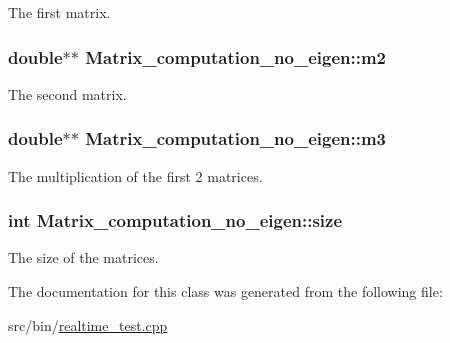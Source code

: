 The first matrix. 

\subsubsection[{\texorpdfstring{m2}{m2}}]{\setlength{\rightskip}{0pt plus 5cm}double$\ast$$\ast$ Matrix\+\_\+computation\+\_\+no\+\_\+eigen\+::m2\hspace{0.3cm}{\ttfamily [private]}}\hypertarget{classMatrix__computation__no__eigen_a4cda5f8f06be2a85621b1ce1eca7cded}{}\label{classMatrix__computation__no__eigen_a4cda5f8f06be2a85621b1ce1eca7cded}


The second matrix. 

\subsubsection[{\texorpdfstring{m3}{m3}}]{\setlength{\rightskip}{0pt plus 5cm}double$\ast$$\ast$ Matrix\+\_\+computation\+\_\+no\+\_\+eigen\+::m3\hspace{0.3cm}{\ttfamily [private]}}\hypertarget{classMatrix__computation__no__eigen_a54b2738e77b3282368ac2c7fd184d2a3}{}\label{classMatrix__computation__no__eigen_a54b2738e77b3282368ac2c7fd184d2a3}


The multiplication of the first 2 matrices. 

\subsubsection[{\texorpdfstring{size}{size}}]{\setlength{\rightskip}{0pt plus 5cm}int Matrix\+\_\+computation\+\_\+no\+\_\+eigen\+::size\hspace{0.3cm}{\ttfamily [private]}}\hypertarget{classMatrix__computation__no__eigen_a1f73cf9e7670c6a78a64cb8977f2dcc6}{}\label{classMatrix__computation__no__eigen_a1f73cf9e7670c6a78a64cb8977f2dcc6}


The size of the matrices. 



The documentation for this class was generated from the following file\+:\begin{DoxyCompactItemize}
\item 
src/bin/\hyperlink{realtime__test_8cpp}{realtime\+\_\+test.\+cpp}\end{DoxyCompactItemize}
